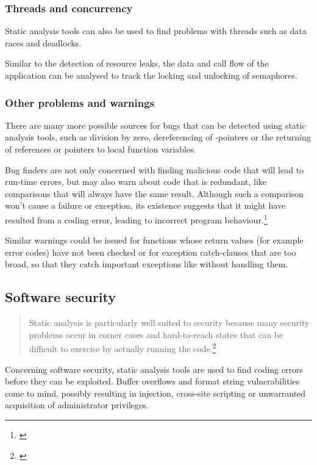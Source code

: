 \subsubsection{Threads and concurrency}

Static analysis tools can also be used to find problems with threads such as data races and deadlocks.

Similar to the detection of resource leaks, the data and call flow of the application can be analysed to track the locking and unlocking of semaphores.

\subsubsection{Other problems and warnings}

There are many more possible sources for bugs that can be detected using static analysis tools, such as division by zero, dereferencing of -pointers or the returning of references or pointers to local function variables.

Bug finders are not only concerned with finding malicious code that will lead to run-time errors, but may also warn about code that is redundant, like comparisons that will always have the same result. Although such a comparison won't cause a failure or exception, its existence suggests that it might have resulted from a coding error, leading to incorrect program behaviour.\footnote{\citep[1]{UsingSAToFindBugs}}

Similar warnings could be issued for functions whose return values (for example error codes) have not been checked or for exception catch-clauses that are too broad, so that they catch important exceptions like  without handling them.

\subsection{Software security}

\begin{quotation}
Static analysis is particularly well suited to security because many security problems occur in corner cases and hard-to-reach states that can be difficult to exercise by actually running the code.\footnote{\citep[4]{SecureProgramming}}
\end{quotation}

Concerning software security, static analysis tools are used to find coding errors before they can be exploited. Buffer overflows and format string vulnerabilities come to mind, possibly resulting in  injection, cross-site scripting or unwarranted acquisition of administrator privileges. 

